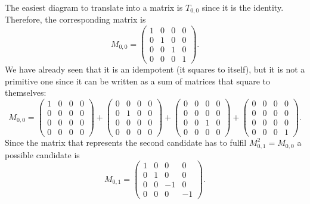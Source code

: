 {The easiest diagram to translate into a matrix is $T_{0,0}$ since it is the identity. Therefore, the corresponding matrix is 
	\begin{equation}
		M_{0,0}=\begin{pmatrix}
			1 & 0 & 0 & 0\\
			0 & 1 & 0 & 0\\
			0 & 0 & 1 & 0\\
			0 & 0 & 0 & 1
		\end{pmatrix}.
	\end{equation}
We have already seen that it is an idempotent (it squares to itself), but it is not a primitive one since it can be written as a sum of matrices that square to themselves:
	\begin{equation}
	\label{eq:primi}
		M_{0,0}=\begin{pmatrix}
		1 & 0 & 0 & 0\\
		0 & 0 & 0 & 0\\
		0 & 0 & 0 & 0\\
		0 & 0 & 0 & 0
		\end{pmatrix}+\begin{pmatrix}
		0 & 0 & 0 & 0\\
		0 & 1 & 0 & 0\\
		0 & 0 & 0 & 0\\
		0 & 0 & 0 & 0
		\end{pmatrix}+\begin{pmatrix}
		0 & 0 & 0 & 0\\
		0 & 0 & 0 & 0\\
		0 & 0 & 1 & 0\\
		0 & 0 & 0 & 0
		\end{pmatrix}+\begin{pmatrix}
		0 & 0 & 0 & 0\\
		0 & 0 & 0 & 0\\
		0 & 0 & 0 & 0\\
		0 & 0 & 0 & 1
		\end{pmatrix}.
	\end{equation}
Since the matrix that represents the second candidate has to fulfil $M_{0,1}^2=M_{0,0}$ a possible candidate is
	\begin{equation}
		M_{0,1}=\begin{pmatrix}
		1 & 0 & 0 & 0\\
		0 & 1 & 0 & 0\\
		0 & 0 & -1 & 0\\
		0 & 0 & 0 & -1
		\end{pmatrix}.
	\end{equation}
}
